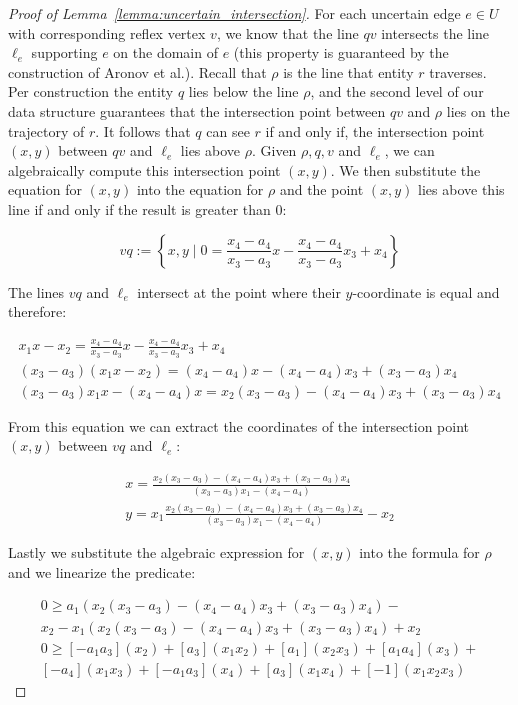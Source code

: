 \documentclass[UKenglish]{lipics-v2019}
\newcommand{\etal}{\textnormal{et al.}\xspace}
\begin{document}
\begin{proof}[Proof of Lemma~\ref{lemma:uncertain_intersection}]
For each uncertain edge $e \in U$ with corresponding reflex vertex $v$, we know that the line $qv$ intersects the line $\ell_e$ supporting $e$ on the domain of $e$ (this property is guaranteed by the construction of Aronov \etal). Recall that $\rho$ is the line that entity $r$ traverses. Per construction the entity $q$ lies below the line $\rho$, and the second level of our data structure guarantees that the intersection point between $qv$ and $\rho$ lies on the trajectory of $r$. It follows that $q$ can see $r$ if and only if, the intersection point $(x,y)$ between $qv$ and $\ell_e$ lies above $\rho$. Given $\rho, q, v$ and $\ell_e$, we can algebraically compute this intersection point $(x,y)$. We then substitute the equation for $(x, y)$ into the equation for $\rho$ and the point $(x,y)$ lies above this line if and only if the result is greater than $0$:

\[
vq := \left\{x,y \mid 0 =  \frac{x_4 - a_4}{x_3 - a_3} x - \frac{x_4 - a_4}{x_3 - a_3}x_3 + x_4  \right\}
\]

The lines $vq$ and $\ell_e$ intersect at the point where their $y$-coordinate is equal and therefore:


\begin{align*}
    x_1 x - x_2 =  \frac{x_4 - a_4}{x_3 - a_3} x - \frac{x_4 - a_4}{x_3 - a_3}x_3 + x_4 \\
    (x_3 - a_3)(x_1 x - x_2) = (x_4 - a_4) x - (x_4 - a_4)x_3 + (x_3 - a_3) x_4 \\
    (x_3 - a_3)x_1 x - (x_4 - a_4) x = x_2 (x_3 - a_3) - (x_4 - a_4)x_3 + (x_3 - a_3) x_4 
\end{align*}


From this equation we can extract the coordinates of the intersection point $(x,y)$ between $vq$ and $\ell_e$:

\begin{align*}
    x = \frac{x_2 (x_3 - a_3) - (x_4 - a_4)x_3 + (x_3 - a_3) x_4}{ (x_3 - a_3)x_1 - (x_4 - a_4)} \\
    y = x_1 \frac{x_2 (x_3 - a_3) - (x_4 - a_4)x_3 + (x_3 - a_3) x_4}{ (x_3 - a_3)x_1 - (x_4 - a_4)} - x_2
\end{align*}

Lastly we substitute the algebraic expression for $(x,y)$ into the formula for $\rho$ and we linearize the predicate:

\begin{align*}
    0 \ge a_1 (x_2 (x_3 - a_3) - (x_4 - a_4)x_3 + (x_3 - a_3) x_4) - \\
    x_2 - x_1 (x_2 (x_3 - a_3) - (x_4 - a_4)x_3 + (x_3 - a_3) x_4) + x_2 \\
    0 \ge [-a_1 a_3] (x_2) + [a_3]( x_1 x_2) + [a_1] (x_2 x_3) + [a_1a_4] (x_3) + \\
    [- a_4] (x_1 x_3) + [- a_1 a_3]( x_4) + [a_3] (x_1 x_4) + [-1](x_1 x_2 x_3)
\end{align*}


\end{proof}
\end{document}
